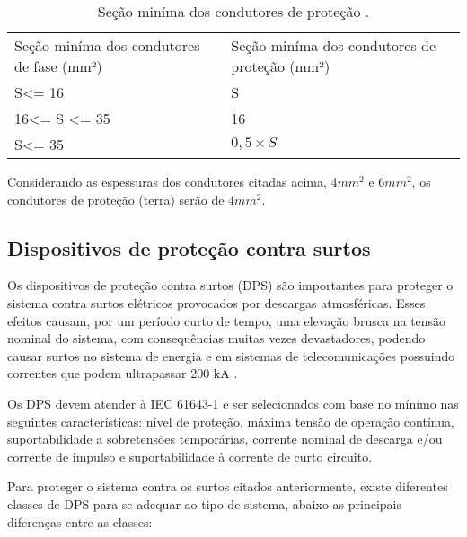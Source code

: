 \begin{table}[H]
 \centering
 \caption{\label{secao}Seção miníma dos condutores de proteção \cite{protecao}.}
 {\renewcommand\arraystretch{1.25}
 \begin{tabular}{ l l }
  \cline{1-1}\cline{2-2}  
    \multicolumn{1}{|p{4.133cm}|}{Seção miníma dos condutores de fase (mm²) \centering } &
    \multicolumn{1}{p{4.450cm}|}{Seção miníma dos condutores de proteção (mm²) \centering }
  \\  
  \cline{1-1}\cline{2-2}  
    \multicolumn{1}{|p{4.133cm}|}{S\textless = 16 \centering } &
    \multicolumn{1}{p{4.450cm}|}{S \centering }
  \\  
  \cline{1-1}\cline{2-2}  
    \multicolumn{1}{|p{4.133cm}|}{16\textless = S \textless = 35 \centering } &
    \multicolumn{1}{p{4.450cm}|}{16 \centering }
  \\  
  \cline{1-1}\cline{2-2}  
    \multicolumn{1}{|p{4.133cm}|}{S\textless = 35 \centering } &
    \multicolumn{1}{p{4.450cm}|}{$0,5 \times S$ \centering }
  \\  
  \hline

 \end{tabular} }
\end{table}

Considerando as espessuras dos condutores citadas acima, $4mm^2$ e $6mm^2$, os condutores de proteção (terra) serão de $4mm^2$.

\subsection{Dispositivos de proteção contra surtos}

Os dispositivos de proteção contra surtos (DPS) são importantes para proteger o sistema contra surtos elétricos provocados por descargas atmosféricas. Esses efeitos causam, por um período curto de tempo, uma elevação brusca na tensão nominal do sistema, com consequências muitas vezes devastadores, podendo causar surtos no sistema de energia e em sistemas de telecomunicações possuindo correntes que podem ultrapassar 200 kA \cite{surtos}.

Os DPS devem atender à IEC 61643-1 \cite{surtos} e ser selecionados com base no mínimo nas seguintes características: nível de proteção, máxima tensão de operação contínua, suportabilidade a sobretensões temporárias, corrente nominal de descarga e/ou corrente de impulso e suportabilidade à corrente de curto circuito.
 
 Para proteger o sistema contra os surtos citados anteriormente, existe diferentes classes de DPS para se adequar ao tipo de sistema, abaixo as principais diferenças entre as classes:
 
